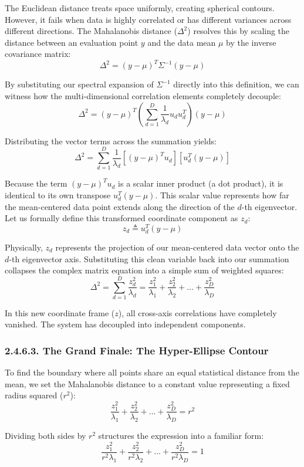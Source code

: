 \documentclass{article}
\begin{document}
The Euclidean distance treats space uniformly, creating spherical contours. However, it fails when data is highly correlated or has different variances across different directions. The Mahalanobis distance ($\Delta^2$) resolves this by scaling the distance between an evaluation point $y$ and the data mean $\mu$ by the inverse covariance matrix:
\[ \Delta^2 = (y - \mu)^T \Sigma^{-1} (y - \mu) \]

By substituting our spectral expansion of $\Sigma^{-1}$ directly into this definition, we can witness how the multi-dimensional correlation elements completely decouple:
\[ \Delta^2 = (y - \mu)^T \left( \sum_{d=1}^{D} \frac{1}{\lambda_d} u_d u_d^T \right) (y - \mu) \]

Distributing the vector terms across the summation yields:
\[ \Delta^2 = \sum_{d=1}^{D} \frac{1}{\lambda_d} \left[ (y - \mu)^T u_d \right] \left[ u_d^T (y - \mu) \right] \]

Because the term $(y - \mu)^T u_d$ is a scalar inner product (a dot product), it is identical to its own transpose $u_d^T (y - \mu)$. This scalar value represents how far the mean-centered data point extends along the direction of the $d$-th eigenvector. Let us formally define this transformed coordinate component as $z_d$:
\[ z_d \triangleq u_d^T (y - \mu) \]

Physically, $z_d$ represents the projection of our mean-centered data vector onto the $d$-th eigenvector axis. Substituting this clean variable back into our summation collapses the complex matrix equation into a simple sum of weighted squares:
\[ \Delta^2 = \sum_{d=1}^{D} \frac{z_d^2}{\lambda_d} = \frac{z_1^2}{\lambda_1} + \frac{z_2^2}{\lambda_2} + \dots + \frac{z_D^2}{\lambda_D} \]

In this new coordinate frame ($z$), all cross-axis correlations have completely vanished. The system has decoupled into independent components.

\subsubsection*{2.4.6.3. The Grand Finale: The Hyper-Ellipse Contour}

To find the boundary where all points share an equal statistical distance from the mean, we set the Mahalanobis distance to a constant value representing a fixed radius squared ($r^2$):
\[ \frac{z_1^2}{\lambda_1} + \frac{z_2^2}{\lambda_2} + \dots + \frac{z_D^2}{\lambda_D} = r^2 \]

Dividing both sides by $r^2$ structures the expression into a familiar form:
\[ \frac{z_1^2}{r^2\lambda_1} + \frac{z_2^2}{r^2\lambda_2} + \dots + \frac{z_D^2}{r^2\lambda_D} = 1 \]
\end{document}
